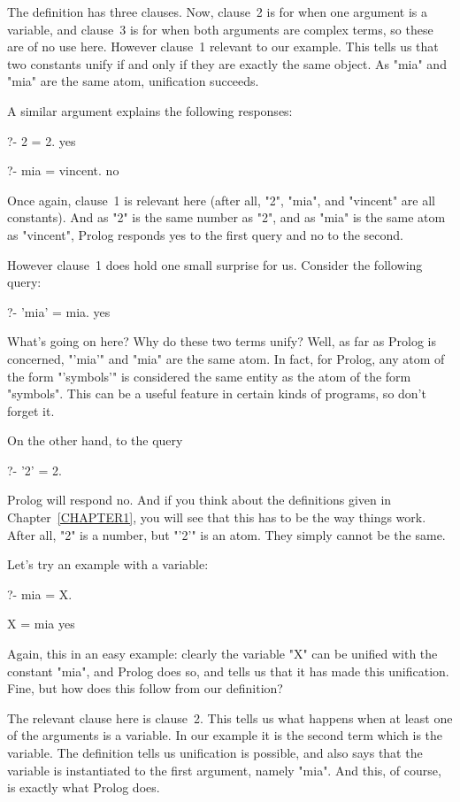 The definition has three clauses. Now, clause~2 is for when one
argument is a variable, and clause~3 is for when both arguments are
complex terms, so these are of no use here. However clause~1 
relevant to our example.  This tells us that two constants unify if
and only if they are exactly the same object. As "mia" and "mia"
are the same atom, unification succeeds.

A similar argument explains the following responses:
\begin{LPNcodedisplay}
?- 2 = 2.
yes

?- mia = vincent.
no
\end{LPNcodedisplay}
%
Once again, clause~1 is relevant here (after all, "2", "mia", and
"vincent" are all constants). And as "2" is the same number as "2",
and as "mia" is  the same atom as "vincent", Prolog
responds yes to the first query and no to the second.

However clause~1 does hold one small surprise for us. Consider the
following query:
\begin{LPNcodedisplay}
?- 'mia' = mia.
yes
\end{LPNcodedisplay}
%
What's going on here? Why do these two terms unify? Well, as far as
Prolog is concerned, "'mia'" and "mia" are the same atom. In fact, for
Prolog, any atom of the form "'symbols'" is considered the same entity
as the atom of the form "symbols". This can be a useful feature in
certain kinds of programs, so don't forget it.

On the other hand, to the query
\begin{LPNcodedisplay}
?- '2' = 2.
\end{LPNcodedisplay}
%
Prolog will respond no. And if you think about the definitions given
in Chapter~\ref{CHAPTER1}, you will see that this has to be the way
things work.  After all, "2" is a number, but "'2'" is an atom. They
simply cannot be the same.

Let's try an example with a variable:
\begin{LPNcodedisplay}
?- mia = X.

X = mia
yes
\end{LPNcodedisplay}
%
Again, this in an easy example: clearly the variable "X" can be
unified with the constant "mia", and Prolog does so, and tells us that
it has made this unification. Fine, but how does this follow from our
definition?

The relevant clause here is clause~2. This tells us what happens when
at least one of the arguments is a variable. In our example it is the
second term which is the variable. The definition tells us unification
is possible, and also says that the variable is instantiated to the
first argument, namely "mia". And this, of course, is exactly what
Prolog does.

